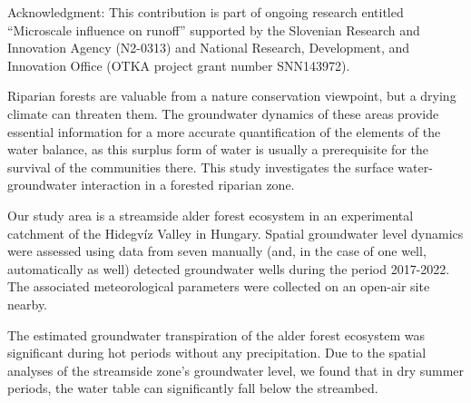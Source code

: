 Acknowledgment: This contribution is part of ongoing research entitled “Microscale influence on runoff” supported by the Slovenian Research and Innovation Agency (N2-0313) and National Research, Development, and Innovation Office (OTKA project grant number SNN143972).
\newpage{}
{}
\begin{flushleft}





\end{flushleft}

\noindent

Riparian forests are valuable from a nature conservation viewpoint, but a drying climate can threaten them. The groundwater dynamics of these areas provide essential information for a more accurate quantification of the elements of the water balance, as this surplus form of water is usually a prerequisite for the survival of the communities there. This study investigates the surface water-groundwater interaction in a forested riparian zone.

Our study area is a streamside alder forest ecosystem in an experimental catchment of the Hidegvíz Valley in Hungary. Spatial groundwater level dynamics were assessed using data from seven manually (and, in the case of one well, automatically as well) detected groundwater wells during the period 2017-2022. The associated meteorological parameters were collected on an open-air site nearby.

The estimated groundwater transpiration of the alder forest ecosystem was significant during hot periods without any precipitation. Due to the spatial analyses of the streamside zone’s groundwater level, we found that in dry summer periods, the water table can significantly fall below the streambed.

